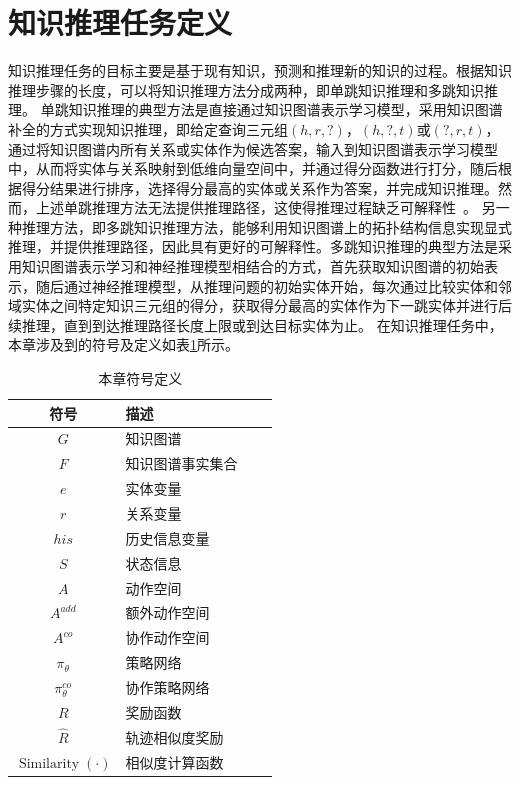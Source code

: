 \documentclass[algorithmlist, AutoFakeBold, AutoFakeSlant, figurelist, tablelist, nomlist, engineering]{seuthesix}
\begin{document}
\section{知识推理任务定义}
知识推理任务的目标主要是基于现有知识，预测和推理新的知识的过程。根据知识推理步骤的长度，可以将知识推理方法分成两种，即单跳知识推理和多跳知识推理。
单跳知识推理的典型方法是直接通过知识图谱表示学习模型，采用知识图谱补全的方式实现知识推理，即给定查询三元组$\left(h, r, ?\right)$，$\left(h, ?, t\right)$或$\left(?, r, t\right)$，通过将知识图谱内所有关系或实体作为候选答案，输入到知识图谱表示学习模型中，从而将实体与关系映射到低维向量空间中，并通过得分函数进行打分，随后根据得分结果进行排序，选择得分最高的实体或关系作为答案，并完成知识推理。然而，上述单跳推理方法无法提供推理路径，这使得推理过程缺乏可解释性~\cite{wang2019deeppath}。
另一种推理方法，即多跳知识推理方法，能够利用知识图谱上的拓扑结构信息实现显式推理，并提供推理路径，因此具有更好的可解释性。多跳知识推理的典型方法是采用知识图谱表示学习和神经推理模型相结合的方式，首先获取知识图谱的初始表示，随后通过神经推理模型，从推理问题的初始实体开始，每次通过比较实体和邻域实体之间特定知识三元组的得分，获取得分最高的实体作为下一跳实体并进行后续推理，直到到达推理路径长度上限或到达目标实体为止。
在知识推理任务中，本章涉及到的符号及定义如表\ref{3_symbols}所示。
\begin{table}
  \centering
  \begin{tabular*}{0.4\textwidth}{@{\extracolsep{\fill}}clcl}
		\toprule[1pt]
    符号 & 描述\\ \hline
    $G$ & 知识图谱\\
    $F$ & 知识图谱事实集合\\
    $e$ & 实体变量\\
    $r$ & 关系变量\\
    $his$ & 历史信息变量\\
    $S$ & 状态信息\\
    $A$ & 动作空间\\
    $A^{add}$ & 额外动作空间\\
    $A^{co}$ & 协作动作空间\\
    $\pi_\theta$ & 策略网络\\
    $\pi_\theta^{co}$ & 协作策略网络\\
    $R$ & 奖励函数\\
    $\hat{R}$ & 轨迹相似度奖励\\
    $\operatorname{Similarity}(\cdot)$ & 相似度计算函数\\
		\bottomrule[1pt]
	\end{tabular*}
  \caption{本章符号定义}
  \label{3_symbols}
\end{table}
\end{document}
